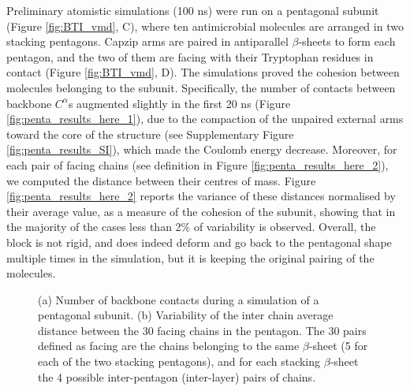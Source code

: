 Preliminary atomistic simulations (100 ns) were run on a pentagonal subunit (Figure \ref{fig:BTI_vmd}, C), where ten antimicrobial molecules are arranged in two stacking pentagons. Capzip arms are paired in antiparallel $\beta$-sheets to form each pentagon, and the two of them are facing with their Tryptophan residues in contact (Figure \ref{fig:BTI_vmd}, D).
%
The simulations proved the cohesion between molecules belonging to the subunit. Specifically, the number of contacts between backbone $C^\alpha$s augmented slightly in the first 20 ns (Figure \ref{fig:penta_results_here_1}), due to the compaction of the unpaired external arms toward the core of the structure (see Supplementary Figure \ref{fig:penta_results_SI}), which made the Coulomb energy decrease.
%
Moreover, for each pair of facing chains (see definition in Figure \ref{fig:penta_results_here_2}), we computed the distance between their centres of mass. Figure \ref{fig:penta_results_here_2} reports the variance of these distances normalised by their average value, as a measure of the cohesion of the subunit, showing that in the majority of the cases less than 2\% of variability is observed. Overall, the block is not rigid, and does indeed deform and go back to the pentagonal shape multiple times in the simulation, but it is keeping the original pairing of the molecules.
\begin{figure}[t!]
\centering
{}
\caption[Cohesion measures on the pentagonal subunit]{(a) Number of backbone contacts during a simulation of a pentagonal subunit. (b) Variability of the inter chain average distance between the 30 facing chains in the pentagon. The 30 pairs defined as facing are the chains belonging to the same $\beta$-sheet (5 for each of the two stacking pentagons), and for each stacking $\beta$-sheet the 4 possible inter-pentagon (inter-layer) pairs of chains.}
\label{fig:penta_results_here}
\end{figure}

